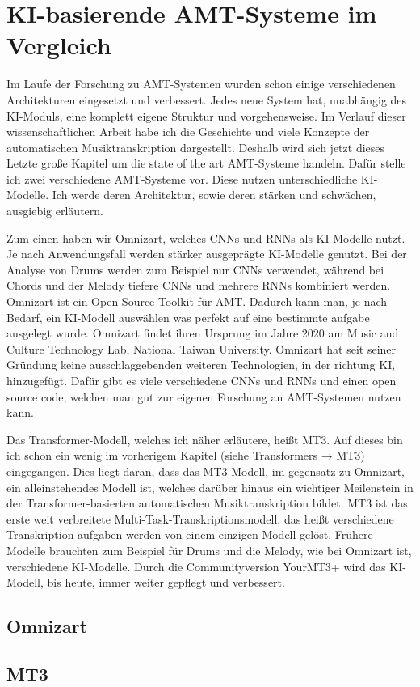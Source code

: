 \section{KI-basierende AMT-Systeme im Vergleich}
Im Laufe der Forschung zu AMT-Systemen wurden schon einige verschiedenen Architekturen eingesetzt und verbessert.
Jedes neue System hat, unabhängig des KI-Moduls, eine komplett eigene Struktur und vorgehensweise.
Im Verlauf dieser wissenschaftlichen Arbeit habe ich die Geschichte
und viele Konzepte der automatischen Musiktranskription dargestellt.
Deshalb wird sich jetzt dieses Letzte große Kapitel um die state of the art AMT-Systeme handeln.
Dafür stelle ich zwei verschiedene AMT-Systeme vor.
Diese nutzen unterschiedliche KI-Modelle.
Ich werde deren Architektur, sowie deren stärken und schwächen, ausgiebig erläutern.

Zum einen haben wir Omnizart, welches CNNs und RNNs als KI-Modelle nutzt.
\cite{wu2021omnizart}
Je nach Anwendungsfall werden stärker ausgeprägte KI-Modelle genutzt.
Bei der Analyse von Drums werden zum Beispiel nur CNNs verwendet,
während bei Chords und der Melody tiefere CNNs und mehrere RNNs kombiniert werden.
Omnizart ist ein Open-Source-Toolkit für AMT.
Dadurch kann man, je nach Bedarf, ein KI-Modell auswählen was perfekt auf eine bestimmte aufgabe ausgelegt wurde.
Omnizart findet ihren Ursprung im Jahre 2020 am Music and Culture Technology Lab, National Taiwan University.
Omnizart hat seit seiner Gründung keine ausschlaggebenden weiteren Technologien, in der richtung KI, hinzugefügt.
Dafür gibt es viele verschiedene CNNs und RNNs und einen open source code,
welchen man gut zur eigenen Forschung an AMT-Systemen nutzen kann.

Das Transformer-Modell, welches ich näher erläutere, heißt MT3.
Auf dieses bin ich schon ein wenig im vorherigem Kapitel (siehe Transformers → MT3) eingegangen.
Dies liegt daran, dass das MT3-Modell, im gegensatz zu Omnizart, ein alleinstehendes Modell ist,
welches darüber hinaus ein wichtiger Meilenstein in der Transformer-basierten automatischen Musiktranskription bildet.
MT3 ist das erste weit verbreitete Multi-Task-Transkriptionsmodell,
das heißt verschiedene Transkription aufgaben werden von einem einzigen Modell gelöst.
Frühere Modelle brauchten zum Beispiel für Drums und die Melody, wie bei Omnizart ist, verschiedene KI-Modelle.
Durch die Communityversion YourMT3+ wird das KI-Modell, bis heute, immer weiter gepflegt und verbessert.

\subsection{Omnizart}
\subsection{MT3}

